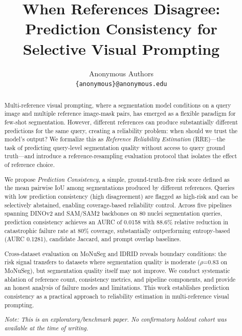 \documentclass[11pt]{article}
\title{\Large\bf When References Disagree:\\Prediction Consistency for Selective Visual Prompting}
\author{Anonymous Authors\\[2pt]
\texttt{\{anonymous\}@anonymous.edu}}
\date{}
\newcommand{\RRE}{RRE}
\begin{document}
\maketitle

\begin{abstract}
Multi-reference visual prompting, where a segmentation model conditions on a query image and 
multiple reference image-mask pairs, has emerged as a flexible paradigm for few-shot segmentation. 
However, different references can produce substantially different predictions for the same query, 
creating a reliability problem: when should we trust the model's output? We formalize this as 
\textit{Reference Reliability Estimation} (\RRE{})---the task of predicting query-level segmentation 
quality without access to query ground truth---and introduce a reference-resampling evaluation 
protocol that isolates the effect of reference choice.

We propose \textit{Prediction Consistency}, a simple, ground-truth-free risk score defined as the mean 
pairwise IoU among segmentations produced by different references. Queries with low prediction 
consistency (high disagreement) are flagged as high-risk and can be selectively abstained, 
enabling coverage-based reliability control. Across five pipelines spanning DINOv2 and SAM/SAM2 
backbones on 80 nuclei segmentation queries, prediction consistency achieves an AURC of 0.0158 
with 88.6\% relative reduction in catastrophic failure rate at 80\% coverage, substantially 
outperforming entropy-based (AURC 0.1281), candidate Jaccard, and prompt overlap baselines. 

Cross-dataset evaluation on MoNuSeg and IDRID reveals boundary conditions: the risk signal 
transfers to datasets where segmentation quality is moderate ($\rho$=0.83 on MoNuSeg), but 
segmentation quality itself may not improve. We conduct systematic ablation of reference count, 
consistency metrics, and pipeline components, and provide an honest analysis of failure modes 
and limitations. This work establishes prediction consistency as a practical approach to 
reliability estimation in multi-reference visual prompting.

\vspace{4pt}
\noindent\textit{Note: This is an exploratory/benchmark paper. No confirmatory holdout cohort was available at the time of writing.}
\end{abstract}

\end{document}
